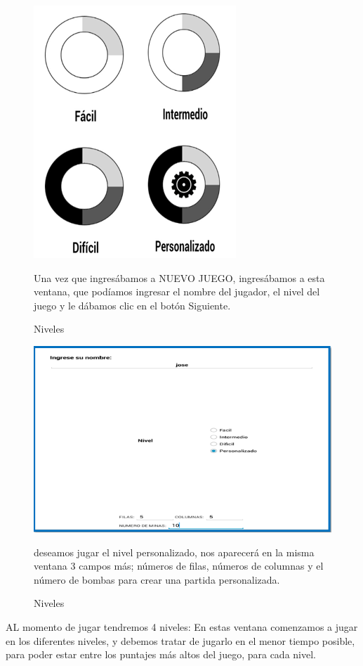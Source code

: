 \begin{figure}[htbp]
\begin{center}
\includegraphics[width=.60\textwidth]{./imagenes/niveles.png}
\caption{Niveles}
\end{center}
Una vez que ingresábamos a NUEVO JUEGO, ingresábamos a esta ventana, que podíamos ingresar el nombre del jugador, el nivel del juego y le dábamos clic en el botón Siguiente.
\end{figure}

\begin{figure}[htbp]
\begin{center}
\includegraphics[width=.60\textwidth]{./imagenes/menu2.png}
\caption{Niveles}
\end{center}
deseamos jugar el nivel personalizado, nos aparecerá en la misma ventana 3 campos más; números de filas, números de columnas y el número de bombas para crear una partida personalizada.
\end{figure}
\newpage
AL momento de jugar tendremos 4 niveles:
En estas ventana comenzamos a jugar en los diferentes niveles, y debemos tratar de jugarlo en el menor tiempo posible, para poder estar entre los puntajes más altos del juego, para cada nivel.

